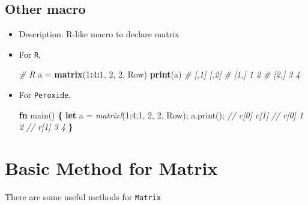 \documentclass[]{book}
\newenvironment{Shaded}{\begin{snugshade}}{\end{snugshade}}
\newcommand{\CommentTok}[1]{\textcolor[rgb]{0.56,0.35,0.01}{\textit{#1}}}
\newcommand{\DecValTok}[1]{\textcolor[rgb]{0.00,0.00,0.81}{#1}}
\newcommand{\KeywordTok}[1]{\textcolor[rgb]{0.13,0.29,0.53}{\textbf{#1}}}
\newcommand{\NormalTok}[1]{#1}
\newcommand{\OperatorTok}[1]{\textcolor[rgb]{0.81,0.36,0.00}{\textbf{#1}}}
\newcommand{\PreprocessorTok}[1]{\textcolor[rgb]{0.56,0.35,0.01}{\textit{#1}}}
\newcommand{\StringTok}[1]{\textcolor[rgb]{0.31,0.60,0.02}{#1}}
\begin{document}
\hypertarget{other-macro}{%
\subsection{Other macro}\label{other-macro}}

\begin{itemize}
\item
  Description: R-like macro to declare matrix
\item
  For \texttt{R},

\begin{Shaded}
\begin{Highlighting}[]
\CommentTok{# R}
\NormalTok{a =}\StringTok{ }\KeywordTok{matrix}\NormalTok{(}\DecValTok{1}\OperatorTok{:}\DecValTok{4}\OperatorTok{:}\DecValTok{1}\NormalTok{, }\DecValTok{2}\NormalTok{, }\DecValTok{2}\NormalTok{, Row)}
\KeywordTok{print}\NormalTok{(a)}
\CommentTok{#      [,1] [,2]}
\CommentTok{# [1,]    1    2}
\CommentTok{# [2,]    3    4}
\end{Highlighting}
\end{Shaded}
\item
  For \texttt{Peroxide},

\begin{Shaded}
\begin{Highlighting}[]
\KeywordTok{fn}\NormalTok{ main() }\OperatorTok{\{}
    \KeywordTok{let}\NormalTok{ a = }\PreprocessorTok{matrix!}\NormalTok{(}\DecValTok{1}\NormalTok{;}\DecValTok{4}\NormalTok{;}\DecValTok{1}\NormalTok{, }\DecValTok{2}\NormalTok{, }\DecValTok{2}\NormalTok{, Row);}
\NormalTok{    a.print();}
    \CommentTok{//       c[0] c[1]}
    \CommentTok{// r[0]     1    2}
    \CommentTok{// r[1]     3    4}
\OperatorTok{\}}
\end{Highlighting}
\end{Shaded}
\end{itemize}

\hypertarget{basic-method-for-matrix}{%
\section{Basic Method for Matrix}\label{basic-method-for-matrix}}

There are some useful methods for \texttt{Matrix}
\end{document}
